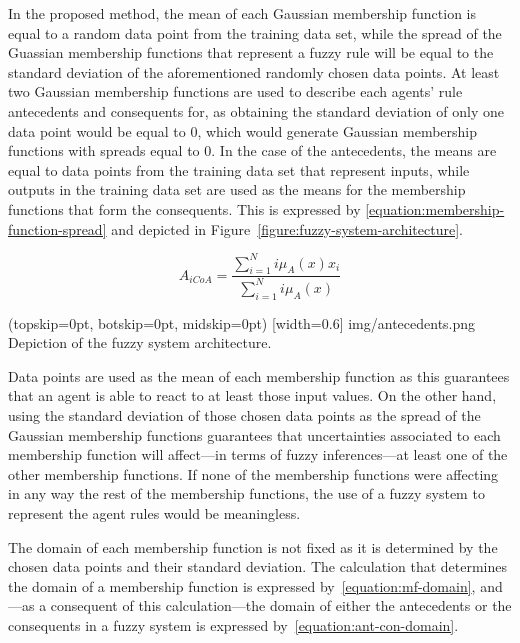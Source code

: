 \documentclass{ieeeaccess}
\begin{document}
In the proposed method, the mean of each Gaussian
membership function is equal to a random data point from the training data set,
while the spread of the Guassian membership functions that represent a fuzzy
rule will be equal to the standard deviation of the aforementioned
randomly chosen data points. At least two Gaussian membership
functions are used to describe each agents' rule antecedents and
consequents for, as obtaining the standard deviation of only one data
point would be equal to 0, which would generate Gaussian membership
functions with spreads equal to 0.
In the case of the antecedents, the means are equal to data
points from the training data set that represent inputs, while outputs in the
training data set are used as the means for the membership functions that form
the consequents. This is expressed by
\ref{equation:membership-function-spread} and depicted in
Figure~\ref{figure:fuzzy-system-architecture}.

\begin{equation}
  \label{equation:membership-function-spread}
  A_{iCoA} = \dfrac{\sum_{i=1}^{N} i\mu_{A}(x) x_{i}}{\sum_{i=1}^{N}
    i\mu_{A}(x)}
\end{equation}

\Figure[](topskip=0pt, botskip=0pt, midskip=0pt)
[width=0.6\linewidth]
{img/antecedents.png}
{Depiction of the fuzzy system architecture.
  \label{figure:fuzzy-system-architecture}}

Data points are used as the mean of each membership function as this guarantees
that an agent is able to react to at least those input values. On the other hand,
using the standard deviation of those chosen data points as the spread of the
Gaussian membership functions guarantees that uncertainties associated to each
membership function will affect---in terms of fuzzy inferences---at least one of
the other membership functions. If none of the membership functions were
affecting in any way the rest of the membership functions, the use of a fuzzy
system to represent the agent rules would be meaningless. 


The domain of each membership function is not fixed as it is determined by the
chosen data points and their standard deviation. The calculation that determines
the domain of a membership function is expressed by~\ref{equation:mf-domain}, and---as a consequent of this
calculation---the domain of either the antecedents or the consequents in a fuzzy
system is expressed by~\ref{equation:ant-con-domain}. %
\end{document}
